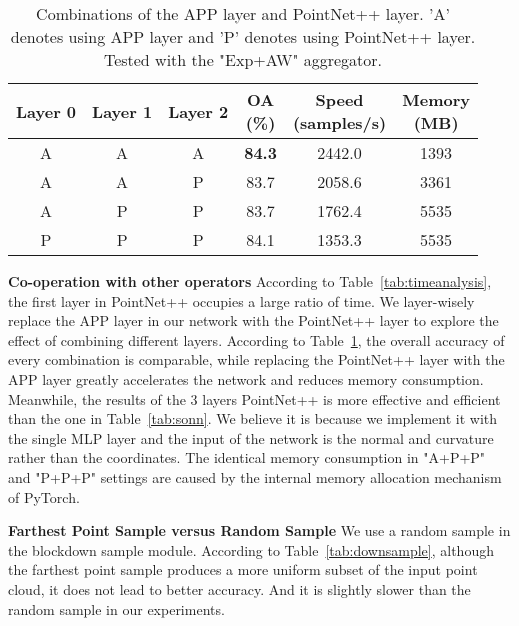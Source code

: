 \documentclass[journal]{IEEEtran}
\begin{document}
\begin{table}[t]
\begin{center}
	\caption{Combinations of the APP layer and PointNet++ layer. 'A' denotes using APP layer and 'P' denotes using PointNet++ layer. Tested with the "Exp+AW" aggregator.}\label{tab:combination}
\begin{tabular}{c|c|c|c|c|c}
\hline
 Layer 0 & Layer 1& Layer 2 & \makecell[c]{OA\\(\%)}  & \makecell[c]{Speed\\(samples/s)} &\makecell[c]{Memory\\(MB)} \\ \hline
A&A&A &{\bf84.3}&2442.0&1393\\ \hline
A&A &P&83.7&2058.6&3361\\ \hline
A&P&P&83.7&1762.4&5535\\ \hline
P&P&P&84.1&1353.3&5535\\ \hline
\end{tabular}
\end{center}
\end{table}

\noindent
{\bf Co-operation with other operators}
According to Table~\ref{tab:timeanalysis}, the first layer in PointNet++ occupies a large ratio of time. We layer-wisely replace the APP layer in our network with the PointNet++ layer to explore the effect of combining different layers. According to Table~\ref{tab:combination}, the overall accuracy of every combination is comparable, while replacing the PointNet++ layer with the APP layer greatly accelerates the network and reduces memory consumption. Meanwhile, the results of the 3 layers PointNet++ is more effective and efficient than the one in Table~\ref{tab:sonn}. We believe it is because we implement it with the single MLP layer and the input of the network is the normal and curvature rather than the coordinates. The identical memory consumption in "A+P+P" and "P+P+P" settings are caused by the internal memory allocation mechanism of PyTorch.



\noindent
{\bf Farthest Point Sample versus Random Sample}
We use a random sample in the blockdown sample module. According to Table~\ref{tab:downsample}, although the farthest point sample produces a more uniform subset of the input point cloud, it does not lead to better accuracy. And it is slightly slower than the random sample in our experiments. 
\end{document}
